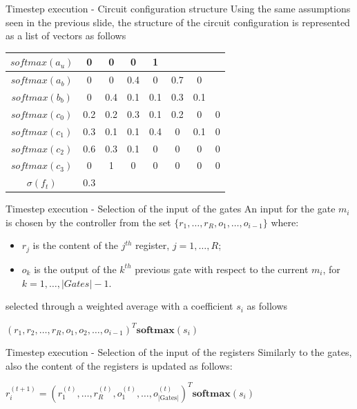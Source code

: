 \documentclass[xcolor={usenames}]{beamer}
\begin{document}
  \begin{frame}{Timestep execution - Circuit configuration structure}
  	Using the same assumptions seen in the previous slide, the structure of the circuit configuration is represented as a list of vectors as follows
  	\begin{table}
  		\centering
  		\begin{tabular}{|c|c|c|c|c|c|c|c|}
  			\hline
  			\cellcolor{mLightGray} $softmax(a_u)$ & 0 & 0 & 0 & 1 & \multicolumn{3}{c|}{} \\ \hline
  			\cellcolor{mLightGray} $softmax(a_{b})$ & 0 & 0 & 0.4 & 0 & 0.7 & 0 &  \\ \hline
  			\cellcolor{mLightGray} $softmax(b_{b})$ & 0 & 0.4 & 0.1 & 0.1 & 0.3 & 0.1 &  \\ \hline
  			\cellcolor{mLightGray} $softmax(c_{0})$ & 0.2 & 0.2 & 0.3 & 0.1 & 0.2 & 0 & 0\\ \hline
  			\cellcolor{mLightGray} $softmax(c_{1})$ & 0.3 & 0.1 & 0.1 & 0.4 & 0 & 0.1 & 0 \\ \hline
  			\cellcolor{mLightGray} $softmax(c_{2})$ & 0.6 & 0.3 & 0.1 & 0 & 0 & 0 & 0 \\ \hline
  			\cellcolor{mLightGray} $softmax(c_{3})$ & 0 & 1 & 0 & 0 & 0 & 0 & 0 \\ \hline
  			\cellcolor{mLightGray} $\sigma(f_{t})$ & 0.3 & \multicolumn{6}{c|}{} \\ \hline
  		\end{tabular}
  	\end{table}
  \end{frame}
  
  \begin{frame}{Timestep execution - Selection of the input of the gates}
  	 An input for the gate $m_i$ is chosen by the controller from the set $\{r_{1}, \dots, r_{R}, o_{1}, \dots, o_{i-1}\}$ where:
	\begin{itemize}
		\item $r_j$ is the content of the $j^{th}$ register, $j=1,\dots,R$;
	\item $o_k$ is the output of the $k^{th}$ previous gate with respect to the current $m_i$, for $k=1,\dots,|Gates| - 1$.
	\end{itemize}
selected through a weighted average with a coefficient $s_{i}$ as follows
	\begin{center}
		$(r_1, r_2, \dots, r_R, o_1, o_2, \dots, o_{i-1})^T\textbf{softmax}(s_i)$
	\end{center}
  \end{frame}
  \begin{frame}{Timestep execution - Selection of the input of the registers}
  	Similarly to the gates, also the content of the registers is updated as follows:
	\begin{center}
		$r_i^{(t + 1)} = (r_1^{(t)}, \dots, r_R^{(t)}, o_1^{(t)}, \dots, o_{|\textrm{Gates}|}^{(t)})^T\textbf{softmax}(s_i)$
	\end{center}
  \end{frame}  
  
\end{document}

